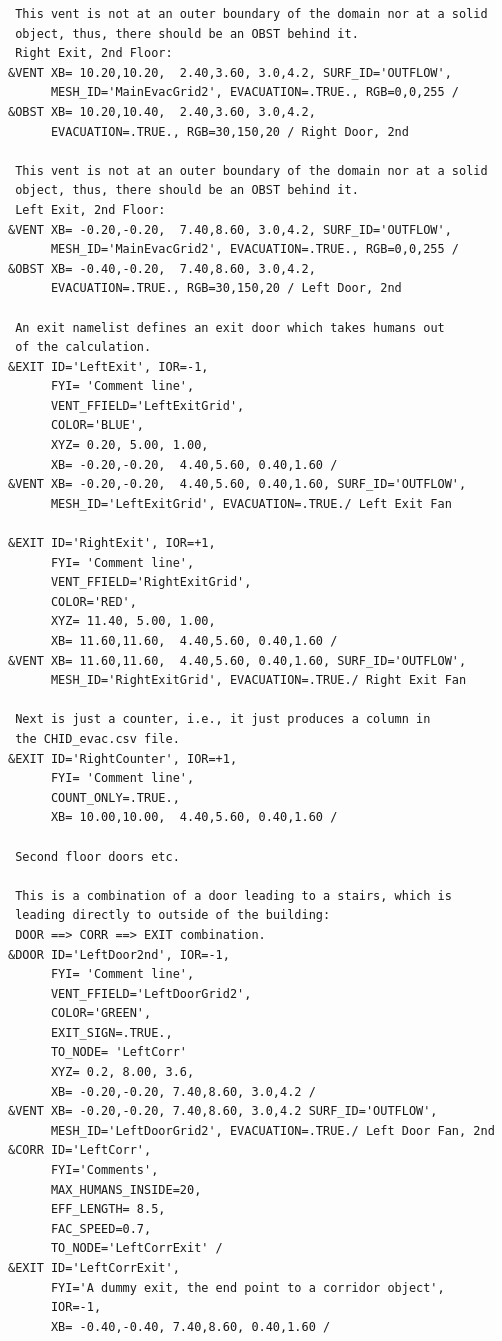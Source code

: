\documentclass[12pt,a4paper,final,twoside]{stylevk}
\begin{document}
{\begin{verbatim}
 This vent is not at an outer boundary of the domain nor at a solid
 object, thus, there should be an OBST behind it.
 Right Exit, 2nd Floor:
&VENT XB= 10.20,10.20,  2.40,3.60, 3.0,4.2, SURF_ID='OUTFLOW', 
      MESH_ID='MainEvacGrid2', EVACUATION=.TRUE., RGB=0,0,255 /
&OBST XB= 10.20,10.40,  2.40,3.60, 3.0,4.2, 
      EVACUATION=.TRUE., RGB=30,150,20 / Right Door, 2nd

 This vent is not at an outer boundary of the domain nor at a solid
 object, thus, there should be an OBST behind it.
 Left Exit, 2nd Floor:
&VENT XB= -0.20,-0.20,  7.40,8.60, 3.0,4.2, SURF_ID='OUTFLOW', 
      MESH_ID='MainEvacGrid2', EVACUATION=.TRUE., RGB=0,0,255 /
&OBST XB= -0.40,-0.20,  7.40,8.60, 3.0,4.2, 
      EVACUATION=.TRUE., RGB=30,150,20 / Left Door, 2nd

 An exit namelist defines an exit door which takes humans out
 of the calculation.
&EXIT ID='LeftExit', IOR=-1,
      FYI= 'Comment line',
      VENT_FFIELD='LeftExitGrid',
      COLOR='BLUE',
      XYZ= 0.20, 5.00, 1.00,
      XB= -0.20,-0.20,  4.40,5.60, 0.40,1.60 /
&VENT XB= -0.20,-0.20,  4.40,5.60, 0.40,1.60, SURF_ID='OUTFLOW', 
      MESH_ID='LeftExitGrid', EVACUATION=.TRUE./ Left Exit Fan

&EXIT ID='RightExit', IOR=+1,
      FYI= 'Comment line',
      VENT_FFIELD='RightExitGrid',
      COLOR='RED',
      XYZ= 11.40, 5.00, 1.00,
      XB= 11.60,11.60,  4.40,5.60, 0.40,1.60 /
&VENT XB= 11.60,11.60,  4.40,5.60, 0.40,1.60, SURF_ID='OUTFLOW', 
      MESH_ID='RightExitGrid', EVACUATION=.TRUE./ Right Exit Fan

 Next is just a counter, i.e., it just produces a column in
 the CHID_evac.csv file.
&EXIT ID='RightCounter', IOR=+1,
      FYI= 'Comment line',
      COUNT_ONLY=.TRUE.,
      XB= 10.00,10.00,  4.40,5.60, 0.40,1.60 /

 Second floor doors etc.

 This is a combination of a door leading to a stairs, which is
 leading directly to outside of the building: 
 DOOR ==> CORR ==> EXIT combination.
&DOOR ID='LeftDoor2nd', IOR=-1,
      FYI= 'Comment line',
      VENT_FFIELD='LeftDoorGrid2',
      COLOR='GREEN',
      EXIT_SIGN=.TRUE.,
      TO_NODE= 'LeftCorr'
      XYZ= 0.2, 8.00, 3.6,
      XB= -0.20,-0.20, 7.40,8.60, 3.0,4.2 /
&VENT XB= -0.20,-0.20, 7.40,8.60, 3.0,4.2 SURF_ID='OUTFLOW', 
      MESH_ID='LeftDoorGrid2', EVACUATION=.TRUE./ Left Door Fan, 2nd
&CORR ID='LeftCorr',
      FYI='Comments',
      MAX_HUMANS_INSIDE=20,
      EFF_LENGTH= 8.5,
      FAC_SPEED=0.7,
      TO_NODE='LeftCorrExit' /
&EXIT ID='LeftCorrExit',
      FYI='A dummy exit, the end point to a corridor object',
      IOR=-1,
      XB= -0.40,-0.40, 7.40,8.60, 0.40,1.60 /


\end{verbatim}}
\end{document}
